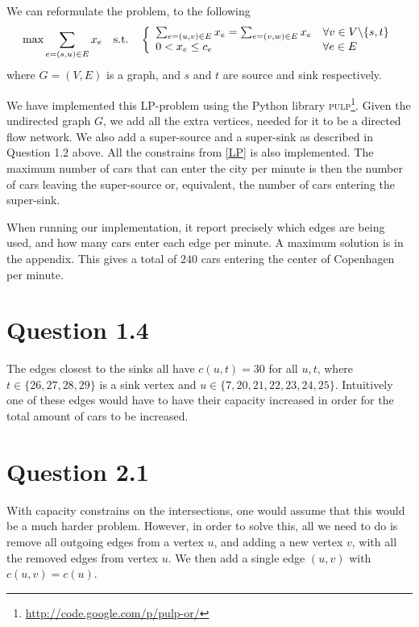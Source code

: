 \documentclass[10pt]{article}
\begin{document}
We can reformulate the problem, to the following
\begin{equation}
	\text{max} \sum_{e=(s,u) \in E} x_e \quad \text{s.t.} \quad \left\{
	\begin{array}{l l}
		\sum_{e=(u,v) \in E} x_e = \sum_{e=(v,w) \in E} x_e & \forall v \in V\backslash\{s,t\}\\
		0 < x_e \leq c_e & \forall e \in E
	\end{array} \right. \label{LP}
\end{equation}
where $G = (V, E)$ is a graph, and $s$ and $t$ are source and sink respectively.

We have implemented this LP-problem using the Python library \textsc{pulp}\footnote{\url{http://code.google.com/p/pulp-or/}}.
Given the undirected graph $G$, we add all the extra vertices, needed for it to be a directed flow network.
We also add a super-source and a super-sink as described in Question 1.2 above.
All the constrains from \eqref{LP} is also implemented.
The maximum number of cars that can enter the city per minute is then the number of cars leaving the super-source or, equivalent, the number of cars entering the super-sink.

When running our implementation, it report precisely which edges are being used, and how many cars enter each edge per minute.
A maximum solution is in the appendix.
This gives a total of $240$ cars entering the center of Copenhagen per minute. 


\section*{Question 1.4} %
\label{sec:question_1_4}
The edges closest to the sinks all have $c(u,t) = 30$ for all $u,t$, where $t \in \{26, 27, 28, 29\}$ is a sink vertex and $u \in \{7, 20, 21, 22, 23, 24, 25\}$. 
Intuitively one of these edges would have to have their capacity increased in order for the total amount of cars to be increased.


\section*{Question 2.1} %
\label{sec:question_2_1}
With capacity constrains on the intersections, one would assume that this would be a much harder problem.
However, in order to solve this, all we need to do is remove all outgoing edges from a vertex $u$, and adding a new vertex $v$, with all the removed edges from vertex $u$.
We then add a single edge $(u,v)$ with $c(u, v) = c(u)$.
\end{document}
